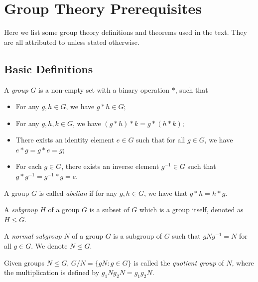 \section{Group Theory Prerequisites}
Here we list some group theory definitions and theorems used in the text. They are all attributed to \cite{group-theory-uon, armstrong_groups_1988} unless stated otherwise.

\subsection{Basic Definitions}
\begin{definition}
	A \textit{group} $G$ is a non-empty set with a binary operation $*$, such that
	\begin{itemize}
		\item For any $g, h \in G$, we have $g * h \in G$;
		\item For any $g, h, k  \in G$, we have $(g * h) * k = g * (h * k)$;
		\item There exists an identity element $e \in G$ such that for all $g \in G$, we have $e * g = g * e = g$;
		\item For each $g \in G$, there exists an inverse element $g^{-1} \in G$ such that $g * g^{-1} = g^{-1} * g = e$. 
	\end{itemize}
\end{definition}

\begin{definition}
	A group $G$ is called \textit{abelian} if for any $g, h \in G$, we have that $g * h = h * g$. 
\end{definition}

\begin{definition}
	A \textit{subgroup} $H$ of a group $G$ is a subset of $G$ which is a group itself, denoted as $H \le G$. 
\end{definition}

\begin{definition}
	A \textit{normal subgroup} $N$ of a group $G$ is a subgroup of $G$ such that $gNg^{-1} = N$ for all $g \in G$. We denote $N \trianglelefteq G$. 
\end{definition}

\begin{definition}
	Given groups $N \trianglelefteq G$, $G / N = \{g N : g \in G\}$ is called the \textit{quotient group} of $N$, where the multiplication is defined by $g_1N g_2N = g_1g_2N$. 
\end{definition}

